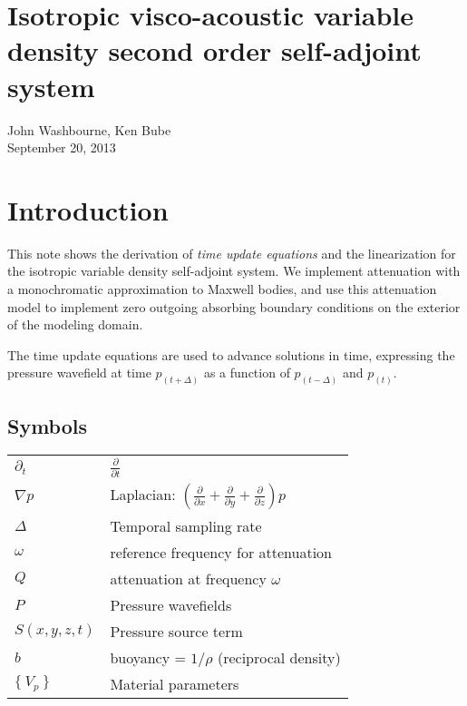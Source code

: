 \documentclass[10pt,fleqn]{article}
\begin{document}
\section{Isotropic visco-acoustic variable density second order self-adjoint system}
John Washbourne, Ken Bube\\
September 20, 2013


\section{Introduction}
This note shows the derivation of \textit{time update equations} and the linearization 
for the isotropic
variable density self-adjoint system. We implement attenuation with a monochromatic
approximation to Maxwell bodies, and use this attenuation model to implement zero
outgoing absorbing boundary conditions on the exterior of the modeling domain.
\vspace{10pt}

The time update equations are used to advance solutions in time, expressing the pressure
wavefield at time $p_{(t + \Delta)}$ as a function of $p_{(t - \Delta)}$ and $p_{(t)}$.

\subsection{Symbols}
\begin{center}
\begin{tabular}{ll} \\[-10pt]
$\partial_t$ & $\displaystyle \frac{\partial }{\partial t}$ \\[10pt]
$\nabla p $ & Laplacian: $ \left(
	\displaystyle \frac{\partial }{\partial x} +
	\displaystyle \frac{\partial }{\partial y} +
	\displaystyle \frac{\partial }{\partial z} \right) p $ \\[15pt]
$\Delta$ & Temporal sampling rate \\[10pt]
$\omega$ & reference frequency for attenuation \\[10pt]
$Q$ & attenuation at frequency $\omega$ \\[10pt]
$P$ & Pressure wavefields\\[10pt]
$S(x,y,z,t)$ & Pressure source term\\[10pt]
$b$ & buoyancy = $\displaystyle 1/\rho $ (reciprocal density) \\[10pt]
$ \{\ V_p\ \} $ & Material parameters \\[10pt]
\end{tabular}
\end{center}
\end{document}
